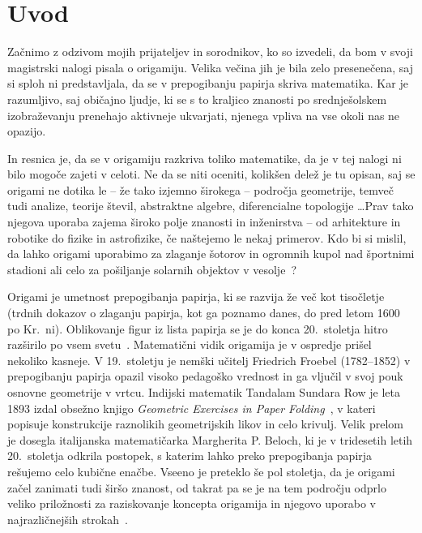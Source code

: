 \section{Uvod}

Začnimo z odzivom mojih prijateljev in sorodnikov, ko so izvedeli, da bom v svoji magistrski nalogi pisala o origamiju. Velika večina jih je bila zelo presenečena, saj si sploh ni predstavljala, da se v prepogibanju papirja skriva matematika. Kar je razumljivo, saj običajno ljudje, ki se s to kraljico znanosti po srednješolskem izobraževanju prenehajo aktivneje ukvarjati, njenega vpliva na vse okoli nas ne opazijo.

In resnica je, da se v origamiju razkriva toliko matematike, da je v tej nalogi ni bilo mogoče zajeti v celoti. Ne da se niti oceniti, kolikšen delež je tu opisan, saj se origami ne dotika le -- že tako izjemno širokega -- področja geometrije, temveč tudi analize, teorije števil, abstraktne algebre, diferencialne topologije \ldots Prav tako njegova uporaba zajema široko polje znanosti in inženirstva -- od arhitekture in robotike do fizike in astrofizike, če naštejemo le nekaj primerov. Kdo bi si mislil, da lahko origami uporabimo za zlaganje šotorov in ogromnih kupol nad športnimi stadioni ali celo za pošiljanje solarnih objektov v vesolje~\cite[str.\ 3--5]{hull2020}?

Origami je umetnost prepogibanja papirja, ki se razvija že več kot tisočletje (trdnih dokazov o zlaganju papirja, kot ga poznamo danes, do pred letom 1600 po Kr.\ ni). Oblikovanje figur iz lista papirja se je do konca 20.\ stoletja hitro razširilo po vsem svetu~\cite{robinson2024}. Matematični vidik origamija je v ospredje prišel nekoliko kasneje. V 19.\ stoletju je nemški učitelj Friedrich Froebel (1782--1852) v prepogibanju papirja opazil visoko pedagoško vrednost in ga vljučil v svoj pouk osnovne geometrije v vrtcu. Indijski matematik Tandalam Sundara Row je leta 1893 izdal obsežno knjigo \emph{Geometric Exercises in Paper Folding}~\cite{row1917}, v kateri popisuje konstrukcije raznolikih geometrijskih likov in celo krivulj. Velik prelom je dosegla italijanska matematičarka Margherita P. Beloch, ki je v tridesetih letih 20.\ stoletja odkrila postopek, s katerim lahko preko prepogibanja papirja rešujemo celo kubične enačbe. Vseeno je preteklo še pol stoletja, da je origami začel zanimati tudi širšo znanost, od takrat pa se je na tem področju odprlo veliko priložnosti za raziskovanje koncepta origamija in njegovo uporabo v najrazličnejših strokah~\cite[str.\ 10]{hull2020}.

